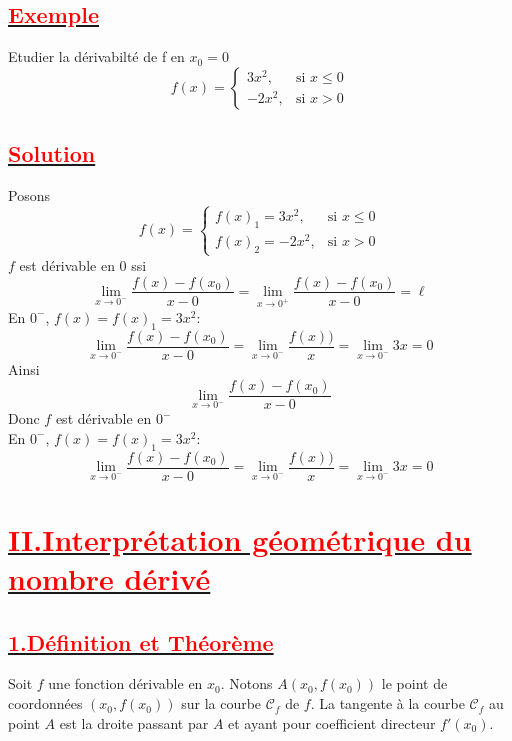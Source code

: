 \documentclass[12pt]{article}
\begin{document}
\subsection*{\underline{\textbf{\textcolor{red}{Exemple}}}}
Etudier la dérivabilté de f en $x_{0}=0$\\
\[ f(x) = \begin{cases} 
  3x^{2}, & \text{si } x \leq 0 \\
  -2x^{2}, & \text{si } x > 0 
\end{cases} \]
\subsection*{\underline{\textbf{\textcolor{red}{Solution}}}}
Posons \[ f(x) = \begin{cases} 
  f(x)_{1}=3x^{2}, & \text{si } x \leq 0 \\
  f(x)_{2}=-2x^{2}, & \text{si } x > 0 
\end{cases} \]
$f$ est dérivable en 0 ssi \[\lim_{x \to 0^{-}}\frac{f(x)-f(x_{0})}{x-0}=\lim_{x \to 0^{+}}\frac{f(x)-f(x_{0})}{x-0}=\ell\]
En $0^{-}$, $f(x)=f(x)_{1}=3x^{2}$: \\
\[\lim_{x \to 0^{-}}\frac{f(x)-f(x_{0})}{x-0}=\lim_{x \to 0^{-}}\frac{f(x))}{x}=\lim_{x \to 0^{-}}3x=0\]
Ainsi \[\lim_{x \to 0^{-}}\frac{f(x)-f(x_{0})}{x-0}\]
Donc $f$ est dérivable en $0^{-}$\\
En $0^{-}$, $f(x)=f(x)_{1}=3x^{2}$: \\

\[\lim_{x \to 0^{-}}\frac{f(x)-f(x_{0})}{x-0}=\lim_{x \to 0^{-}}\frac{f(x))}{x}=\lim_{x \to 0^{-}}3x=0\]
\section*{\underline{\textbf{\textcolor{red}{II.Interprétation géométrique du nombre dérivé}}}}
\subsection*{\underline{\textbf{\textcolor{red}{1.Définition et Théorème}}}}
Soit $f$ une fonction dérivable en $x_0$. Notons $A(x_0, f(x_0))$ le point de coordonnées $(x_0, f(x_0))$ sur la courbe $\mathcal{C}_f$ de $f$. La tangente à la courbe $\mathcal{C}_f$ au point $A$ est la droite passant par $A$ et ayant pour coefficient directeur $f'(x_0)$.\\
\end{document}
